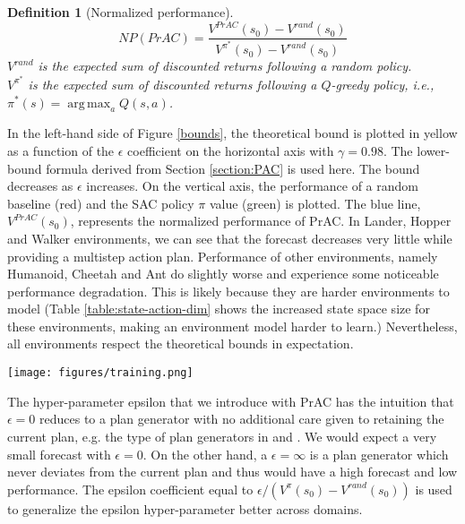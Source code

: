 \documentclass[letterpaper]{article} %
\DeclareMathOperator*{\argmax}{arg\,max}
\newtheorem{definition}{Definition}[]
\begin{document}
\begin{definition}[Normalized performance]
$$NP(PrAC)=\frac{V^{PrAC}(s_0) -V^{rand}(s_0)}{V^{\pi^*}(s_0)-V^{rand}(s_0)}$$
$V^{rand}$ is the expected sum of discounted returns following a random policy.\\
$V^{\pi^*}$ is the expected sum of discounted returns following a $Q$-greedy policy, i.e., $\pi^*(s)=\argmax_aQ(s,a)$. 
\end{definition}

In the left-hand side of Figure \ref{bounds}, the theoretical bound is plotted in yellow as a function of the $\epsilon$ coefficient on the horizontal axis with $\gamma = 0.98$. The lower-bound formula derived from Section \ref{section:PAC} is used here. The bound decreases as $\epsilon$ increases. On the vertical axis, the performance of a random baseline (red) and the SAC policy $\pi$ value (green) is plotted. The blue line, $V^{PrAC}(s_0)$, represents the normalized performance of PrAC. In Lander, Hopper and Walker environments, we can see that the forecast decreases very little while providing a multistep action plan. Performance of other environments, namely Humanoid, Cheetah and Ant do slightly worse and experience some noticeable performance degradation. This is likely because they are harder environments to model (Table \ref{table:state-action-dim} shows the increased state space size for these environments, making an environment model harder to learn.) Nevertheless, all environments respect the theoretical bounds in expectation.  

%

\begin{figure*}
  \texttt{[image: figures/training.png]}
  \caption{Top: training curves from representative environments. The $y$ axis is the normalized episode reward. Bottom: The associated forecast for the environments. The baseline algorithm shows SAC without any modifications. Experiments run with 5 replications of each setting. Shown with 1 std. Mean and std aggregated over rolling window of 20 episodes. The forecast of PrAC(0.1) for cheetah and humanoid has been capped at 16 and 20, respectively, for computational considerations. Humanoid-0.1 is stopped after 3e6 steps as it fails to improve beyond random.}
  \label{figure:training}
\end{figure*}

The hyper-parameter epsilon that we introduce with PrAC has the intuition that $\epsilon=0$ reduces to a plan generator with no additional care given to retaining the current plan, e.g. the type of plan generators in \cite{racaniere2017imagination} and \cite{kim2020communication}. We would expect a very small forecast with $\epsilon=0$. On the other hand, a $\epsilon=\infty$ is a plan generator which never deviates from the current plan and thus would have a high forecast and low performance. The epsilon coefficient equal to $\epsilon / (V^{\pi}(s_0)-V^{rand}(s_0))$ is used to generalize the epsilon hyper-parameter better across domains.
\end{document}
